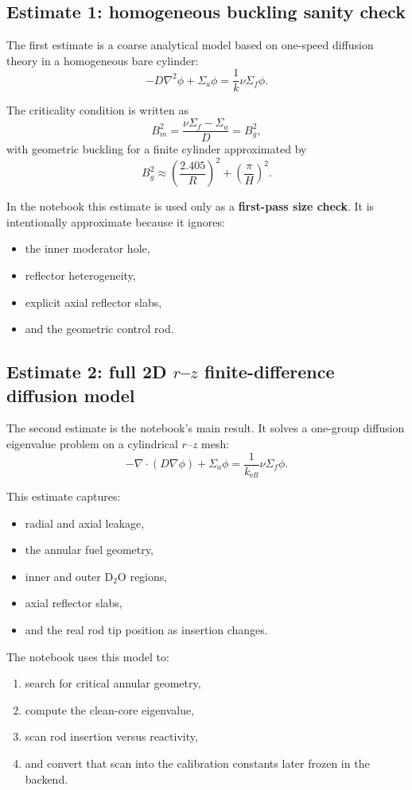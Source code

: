 \documentclass[11pt]{article}
\begin{document}
\subsection{Estimate 1: homogeneous buckling sanity check}

The first estimate is a coarse analytical model based on one-speed diffusion
theory in a homogeneous bare cylinder:
\[
-D\nabla^2 \phi + \Sigma_a \phi = \frac{1}{k}\nu\Sigma_f \phi.
\]

The criticality condition is written as
\[
B_m^2 = \frac{\nu\Sigma_f - \Sigma_a}{D} = B_g^2,
\]
with geometric buckling for a finite cylinder approximated by
\[
B_g^2 \approx \left(\frac{2.405}{R}\right)^2 + \left(\frac{\pi}{H}\right)^2.
\]

In the notebook this estimate is used only as a \textbf{first-pass size check}.
It is intentionally approximate because it ignores:
\begin{itemize}
  \item the inner moderator hole,
  \item reflector heterogeneity,
  \item explicit axial reflector slabs,
  \item and the geometric control rod.
\end{itemize}

\subsection{Estimate 2: full 2D $r$--$z$ finite-difference diffusion model}

The second estimate is the notebook's main result.  It solves a one-group
diffusion eigenvalue problem on a cylindrical $r$--$z$ mesh:
\[
-\nabla \cdot \left(D \nabla \phi\right) + \Sigma_a \phi
= \frac{1}{k_{\mathrm{eff}}}\nu\Sigma_f \phi.
\]

This estimate captures:
\begin{itemize}
  \item radial and axial leakage,
  \item the annular fuel geometry,
  \item inner and outer D$_2$O regions,
  \item axial reflector slabs,
  \item and the real rod tip position as insertion changes.
\end{itemize}

The notebook uses this model to:
\begin{enumerate}
  \item search for critical annular geometry,
  \item compute the clean-core eigenvalue,
  \item scan rod insertion versus reactivity,
  \item and convert that scan into the calibration constants later frozen in the
        backend.
\end{enumerate}
\end{document}
